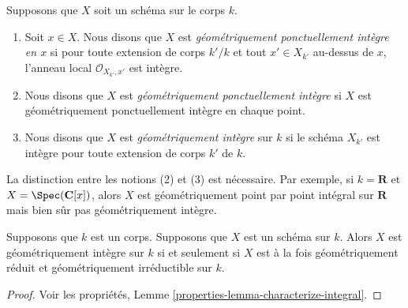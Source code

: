\begin{definition}
\label{definition-geometrically-integral}
Supposons que $X$ soit un schéma sur le corps $k$.
\begin{enumerate}
\item Soit $x \in X$. Nous disons que $X$ est {\it
géométriquement ponctuellement intègre en $x$ } si pour toute
extension de corps $k'/k$ et tout $x' \in X_{k'}$ au-dessus de $x$,
l'anneau local $\mathcal{O}_{X_{k'}, x'}$ est intègre. \item Nous
disons que $X$ est {\it géométriquement ponctuellement intègre } si
$X$ est géométriquement ponctuellement intègre en chaque point. \item
Nous disons que $X$ est {\it géométriquement intègre } sur $k$ si le
schéma $X_{k'}$ est intègre pour toute extension de corps $k'$ de $k$.
\end{enumerate}
\end{definition}

\noindent
La distinction entre les notions (2) et (3) est nécessaire.
Par exemple, si $k = \mathbf{R}$ et $X =
\Spec(\mathbf{C}[x])$, alors $X$ est géométriquement point par point
intégral sur $\mathbf{R}$ mais bien sûr pas géométriquement intègre.

\begin{lemma}
\label{lemma-geometrically-integral}
Supposons que $k$ est un corps. Supposons
que $X$ est un schéma sur $k$. Alors $X$ est
géométriquement intègre sur $k$ si et
seulement si $X$ est à la fois géométriquement
réduit et géométriquement irréductible sur $k$.
\end{lemma}

\begin{proof}
Voir les propriétés, Lemme \ref{properties-lemma-characterize-integral}.
\end{proof}

